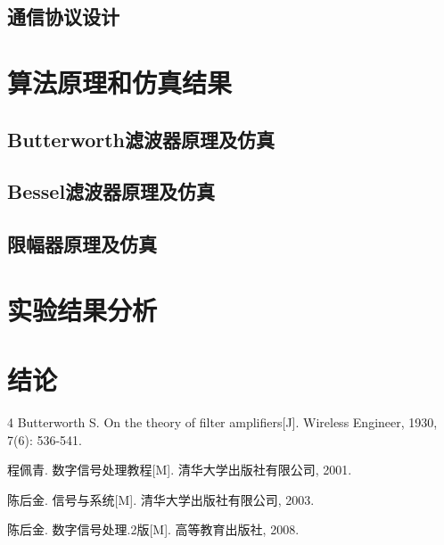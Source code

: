 \documentclass[10pt,a4paper]{article}
\begin{document}

\subsection{通信协议设计}


\section{算法原理和仿真结果}

\subsection{Butterworth滤波器原理及仿真}


\subsection{Bessel滤波器原理及仿真}


\subsection{限幅器原理及仿真}





\section{实验结果分析}
\section{结论}



\begin{thebibliography}{4}
Butterworth S. On the theory of filter amplifiers[J]. Wireless Engineer, 1930, 7(6): 536-541.

程佩青. 数字信号处理教程[M]. 清华大学出版社有限公司, 2001.

陈后金. 信号与系统[M]. 清华大学出版社有限公司, 2003.

陈后金. 数字信号处理.2版[M]. 高等教育出版社, 2008.
\end{thebibliography}
\end{document}
